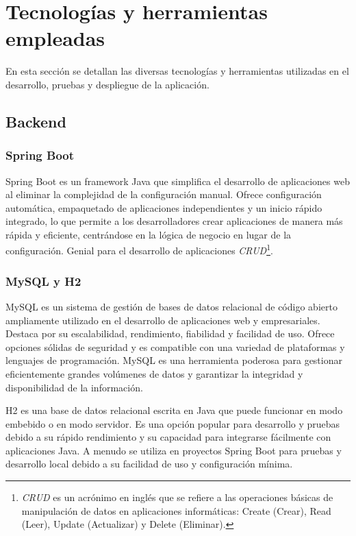 
\section{Tecnologías y herramientas empleadas}
En esta sección se detallan las diversas tecnologías y herramientas utilizadas en el desarrollo, pruebas y despliegue de la aplicación.

\subsection{Backend}

\subsubsection{Spring Boot}
Spring Boot\cite{spring-boot} es un framework Java que simplifica el desarrollo de aplicaciones web al eliminar la
complejidad de la configuración manual. Ofrece configuración automática, empaquetado de aplicaciones independientes y un inicio rápido integrado,
lo que permite a los desarrolladores crear aplicaciones de manera más rápida y eficiente, centrándose en la lógica de negocio en lugar de la configuración.
Genial para el desarrollo de aplicaciones \textit{CRUD}\footnote{\textit{CRUD} es un acrónimo en inglés que se refiere a las operaciones
básicas de manipulación de datos en aplicaciones informáticas: Create (Crear), Read (Leer), Update (Actualizar) y Delete (Eliminar).}.

\subsubsection{MySQL y H2}
MySQL es un sistema de gestión de bases de datos relacional de código abierto ampliamente utilizado en el desarrollo de
aplicaciones web y empresariales. Destaca por su escalabilidad, rendimiento, fiabilidad y facilidad de uso. Ofrece opciones
sólidas de seguridad y es compatible con una variedad de plataformas y lenguajes de programación. MySQL es una herramienta poderosa
para gestionar eficientemente grandes volúmenes de datos y garantizar la integridad y disponibilidad de la información.

H2 es una base de datos relacional escrita en Java que puede funcionar en modo embebido o en modo servidor. Es una opción popular
para desarrollo y pruebas debido a su rápido rendimiento y su capacidad para integrarse fácilmente con aplicaciones Java. A menudo se
utiliza en proyectos Spring Boot para pruebas y desarrollo local debido a su facilidad de uso y configuración mínima.

